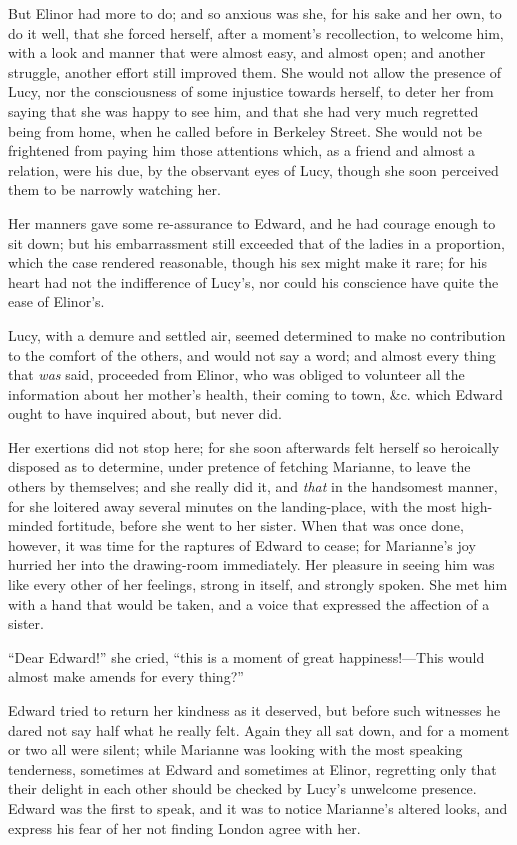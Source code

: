 But Elinor had more to do; and so anxious was she,
for his sake and her own, to do it well, that she
forced herself, after a moment's recollection,
to welcome him, with a look and manner that were almost easy,
and almost open; and another struggle, another effort still
improved them.  She would not allow the presence of Lucy,
nor the consciousness of some injustice towards herself,
to deter her from saying that she was happy to see him,
and that she had very much regretted being from home,
when he called before in Berkeley Street.  She would
not be frightened from paying him those attentions which,
as a friend and almost a relation, were his due, by the
observant eyes of Lucy, though she soon perceived them
to be narrowly watching her.

Her manners gave some re-assurance to Edward, and he
had courage enough to sit down; but his embarrassment still
exceeded that of the ladies in a proportion, which the case
rendered reasonable, though his sex might make it rare;
for his heart had not the indifference of Lucy's, nor
could his conscience have quite the ease of Elinor's.

Lucy, with a demure and settled air, seemed determined
to make no contribution to the comfort of the others,
and would not say a word; and almost every thing that \emph{was}
said, proceeded from Elinor, who was obliged to volunteer
all the information about her mother's health, their coming
to town, \&c. which Edward ought to have inquired about,
but never did.

Her exertions did not stop here; for she soon
afterwards felt herself so heroically disposed as
to determine, under pretence of fetching Marianne,
to leave the others by themselves; and she really did it,
and \emph{that} in the handsomest manner, for she loitered away
several minutes on the landing-place, with the most
high-minded fortitude, before she went to her sister.
When that was once done, however, it was time for the raptures
of Edward to cease; for Marianne's joy hurried her into
the drawing-room immediately.  Her pleasure in seeing him
was like every other of her feelings, strong in itself,
and strongly spoken.  She met him with a hand that would
be taken, and a voice that expressed the affection of a sister.

``Dear Edward!'' she cried, ``this is a moment of great
happiness!---This would almost make amends for every thing?''

Edward tried to return her kindness as it deserved,
but before such witnesses he dared not say half what he
really felt.  Again they all sat down, and for a moment
or two all were silent; while Marianne was looking with the
most speaking tenderness, sometimes at Edward and sometimes
at Elinor, regretting only that their delight in each
other should be checked by Lucy's unwelcome presence.
Edward was the first to speak, and it was to notice
Marianne's altered looks, and express his fear of her
not finding London agree with her.

